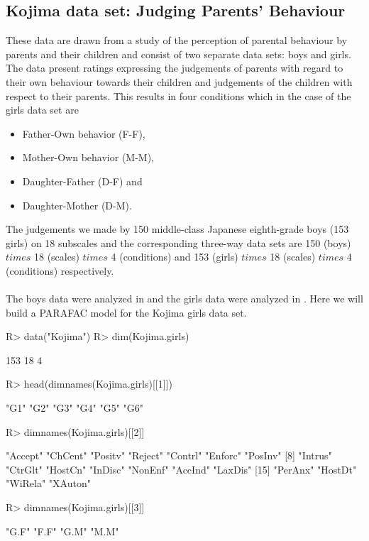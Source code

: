 \documentclass[article,shortnames, nojss]{jss}
\newcommand{\bi}{\begin{itemize}}
\newcommand{\ei}{\end{itemize}}
\begin{document}
\subsection{Kojima data set: Judging Parents' Behaviour}
\label{sec:ex-kojima}
These data are drawn from a study \citep{kojima:1975} of the perception
of parental behaviour by parents and their children and consist of
two separate data sets: boys and girls. The data present ratings
expressing the judgements of parents with regard to their own
behaviour towards their children and judgements of the children
with respect to their parents. This results in four conditions
which in the case of the girls data set are
\bi
\item Father-Own behavior (F-F),
\item Mother-Own behavior (M-M),
\item Daughter-Father (D-F) and
\item Daughter-Mother (D-M).
\ei
The judgements we made by 150 middle-class Japanese eighth-grade boys
(153 girls) on 18 subscales and the corresponding three-way data sets are
150 (boys) $times$ 18 (scales) $times$ 4 (conditions) and 153 (girls)
$times$ 18 (scales) $times$ 4 (conditions) respectively.\\\\
The boys data were analyzed in \citet{kroonenberg:2008} and the girls data were analyzed in
\citet{kroonenberg:2009}. Here we will build a PARAFAC model for the Kojima girls data set.
\begin{Schunk}
\begin{Sinput}
R> data("Kojima")
R> dim(Kojima.girls)
\end{Sinput}
\begin{Soutput}
[1] 153  18   4
\end{Soutput}
\begin{Sinput}
R> head(dimnames(Kojima.girls)[[1]])
\end{Sinput}
\begin{Soutput}
[1] "G1" "G2" "G3" "G4" "G5" "G6"
\end{Soutput}
\begin{Sinput}
R> dimnames(Kojima.girls)[[2]]
\end{Sinput}
\begin{Soutput}
 [1] "Accept" "ChCent" "Positv" "Reject" "Contrl" "Enforc" "PosInv"
 [8] "Intrus" "CtrGlt" "HostCn" "InDisc" "NonEnf" "AccInd" "LaxDis"
[15] "PerAnx" "HostDt" "WiRela" "XAuton"
\end{Soutput}
\begin{Sinput}
R> dimnames(Kojima.girls)[[3]]
\end{Sinput}
\begin{Soutput}
[1] "G.F" "F.F" "G.M" "M.M"
\end{Soutput}
\end{Schunk}
\end{document}
